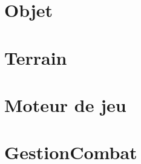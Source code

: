 \documentclass[a4paper, 11pt, notitlepage]{report}
\begin{document}
\section{Objet}
\begin{Test}



\end{Test}

\section{Terrain}
\begin{Test}

	    
\end{Test}


\section{Moteur de jeu}
\begin{Test}
	    
\end{Test}
\section{GestionCombat}
\begin{Test}
	

\end{Test}
\end{document}
